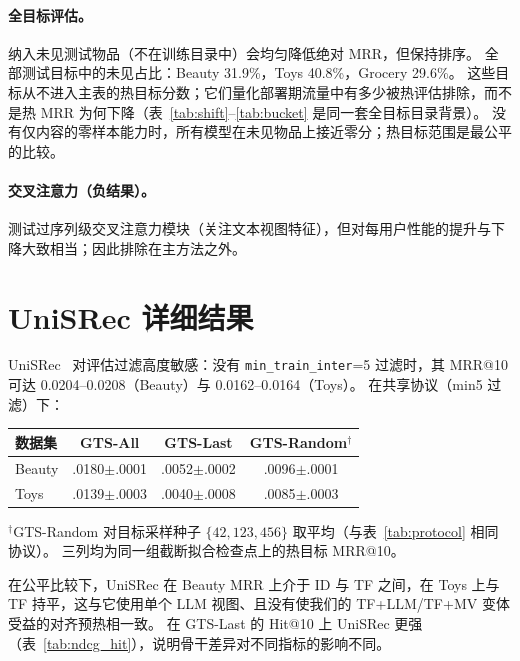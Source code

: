 \documentclass[sigconf,natbib=true,anonymous]{acmart}
\newcommand{\tfllm}{\textsc{TF+LLM}\xspace}
\newcommand{\tfmv}{\textsc{TF+MV}\xspace}
\begin{document}
\paragraph{全目标评估。}
纳入未见测试物品（不在训练目录中）会均匀降低绝对 MRR，但保持排序。
全部测试目标中的未见占比：Beauty 31.9\%，Toys 40.8\%，Grocery 29.6\%。
这些目标从不进入主表的热目标分数；它们量化部署期流量中有多少被热评估排除，而不是热 MRR 为何下降（表~\ref{tab:shift}--\ref{tab:bucket} 是同一套全目标目录背景）。
没有仅内容的零样本能力时，所有模型在未见物品上接近零分；热目标范围是最公平的比较。

\paragraph{交叉注意力（负结果）。}
\label{app:cross}
测试过序列级交叉注意力模块（关注文本视图特征），但对每用户性能的提升与下降大致相当；因此排除在主方法之外。

\section{UniSRec 详细结果}
\label{app:unisrec}

UniSRec~\cite{hou2022unisrec} 对评估过滤高度敏感：没有 \texttt{min\_train\_inter}=5 过滤时，其 MRR@10 可达 0.0204--0.0208（Beauty）与 0.0162--0.0164（Toys）。
在共享协议（min5 过滤）下：

\begin{table}[h]
\centering
\small
\begin{tabular}{@{}lccc@{}}
\toprule
数据集 & GTS-All & GTS-Last & GTS-Random$^\dagger$ \\
\midrule
Beauty & .0180$\pm$.0001 & .0052$\pm$.0002 & .0096$\pm$.0001 \\
Toys   & .0139$\pm$.0003 & .0040$\pm$.0008 & .0085$\pm$.0003 \\
\bottomrule
\end{tabular}
\end{table}

\noindent$^\dagger$GTS-Random 对目标采样种子 $\{42,123,456\}$ 取平均（与表~\ref{tab:protocol} 相同协议）。
三列均为同一组截断拟合检查点上的热目标 MRR@10。

在公平比较下，UniSRec 在 Beauty MRR 上介于 ID 与 TF 之间，在 Toys 上与 TF 持平，这与它使用单个 LLM 视图、且没有使我们的 \tfllm/\tfmv 变体受益的对齐预热相一致。
在 GTS-Last 的 Hit@10 上 UniSRec 更强（表~\ref{tab:ndcg_hit}），说明骨干差异对不同指标的影响不同。



\end{document}
